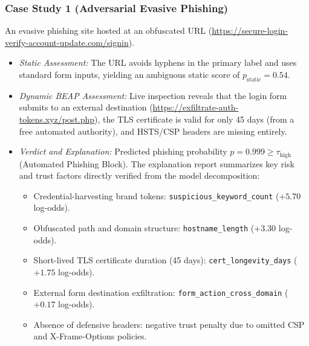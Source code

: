 \documentclass[conference]{IEEEtran}
\begin{document}
\subsubsection{Case Study 1 (Adversarial Evasive Phishing)} An evasive phishing site hosted at an obfuscated URL (\url{https://secure-login-verify-account-update.com/signin}).
\begin{itemize}[leftmargin=1.5em]
    \item \textit{Static Assessment:} The URL avoids hyphens in the primary label and uses standard form inputs, yielding an ambiguous static score of $p_{\text{static}} = 0.54$.
    \item \textit{Dynamic BEAP Assessment:} Live inspection reveals that the login form submits to an external destination (\url{https://exfiltrate-auth-tokens.xyz/post.php}), the TLS certificate is valid for only 45 days (from a free automated authority), and HSTS/CSP headers are missing entirely.
    \item \textit{Verdict and Explanation:} Predicted phishing probability $p = 0.999 \ge \tau_{\text{high}}$ (Automated Phishing Block). The explanation report summarizes key risk and trust factors directly verified from the model decomposition:
    \begin{itemize}[leftmargin=1.2em,label=--]
        \item Credential-harvesting brand tokens: \texttt{suspicious\_keyword\_count} ($+5.70$ log-odds).
        \item Obfuscated path and domain structure: \texttt{hostname\_length} ($+3.30$ log-odds).
        \item Short-lived TLS certificate duration (45 days): \texttt{cert\_longevity\_days} ($+1.75$ log-odds).
        \item External form destination exfiltration: \texttt{form\_action\_cross\_domain} ($+0.17$ log-odds).
        \item Absence of defensive headers: negative trust penalty due to omitted CSP and X-Frame-Options policies.
    \end{itemize}
\end{itemize}
\end{document}
